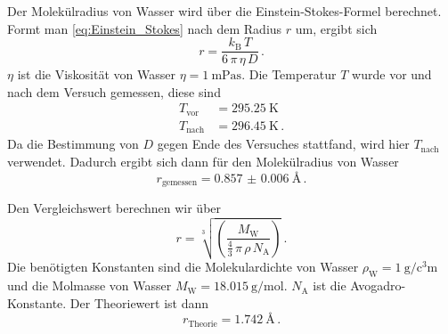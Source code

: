 Der Molekülradius von Wasser wird über die Einstein-Stokes-Formel berechnet.
Formt man \autoref{eq:Einstein_Stokes} nach dem Radius $r$ um, ergibt sich 
\begin{equation}
    r =  \frac{k_\text{B} \, T}{6 \, \pi \, \eta \, D } \, .
    \label{eq:stokes}
\end{equation}
$\eta$ ist die Viskosität von Wasser $\eta = \SI{1}{\milli\pascal\second} $. \cite{wasser}
Die Temperatur $T$ wurde vor und nach dem Versuch gemessen, diese sind 
\begin{align*}
    T_\text{vor} &= \SI{295.25}{\kelvin} \\
    T_\text{nach} &= \SI{296.45}{\kelvin} \, .
\end{align*}
Da die Bestimmung von $D$ gegen Ende des Versuches stattfand, wird hier $T_\text{nach}$ verwendet.
Dadurch ergibt sich dann für den Molekülradius von Wasser
\begin{equation*}
    r_\text{gemessen} = \SI{0.857(6)}{\angstrom}  \, .
    \label{eq:radius1}
\end{equation*}

Den Vergleichswert berechnen wir über
\begin{equation}
    r =  \sqrt[3]{ \left(  \frac{M_\text{W}}{\frac{4}{3} \, \pi \, \rho \, N_\text{A} }  \right)} \, .
    \label{eq:hexagonal}
\end{equation}
Die benötigten Konstanten sind die Molekulardichte von Wasser $\rho _\text{W} = \SI{1}{\gram\per\cubic\centi\meter}$ und die Molmasse von Wasser
$M _\text{W} = \SI{18.015}{\gram\per\mol}$. \cite{wasser}
$N_\text{A}$ ist die Avogadro-Konstante.
Der Theoriewert ist dann 
\begin{equation*}
    r_\text{Theorie} = \SI{1.742}{\angstrom}  \, .
    \label{eq:radius2}
\end{equation*}
